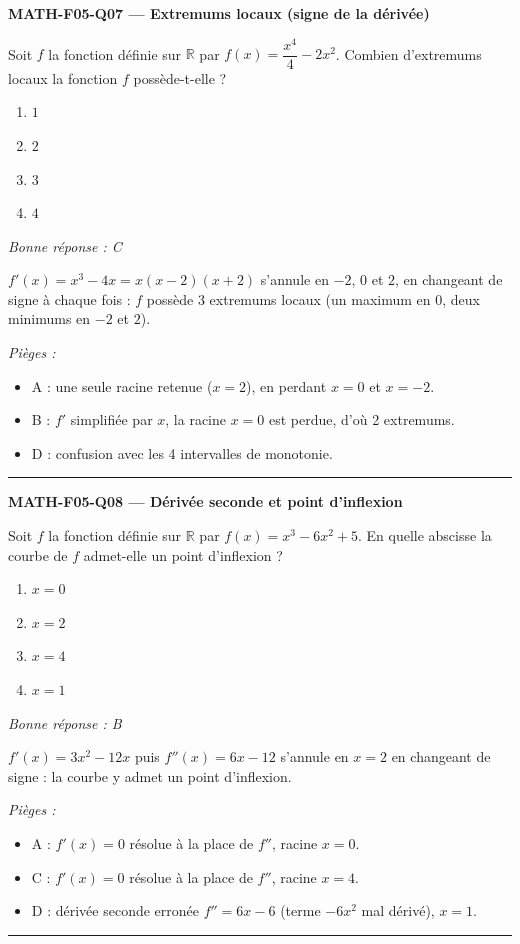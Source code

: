 \documentclass[11pt,a4paper]{article}
\newcommand{\R}{\mathbb{R}}\newcommand{\N}{\mathbb{N}}\newcommand{\Z}{\mathbb{Z}}
\begin{document}
\noindent\textbf{MATH-F05-Q07 --- Extremums locaux (signe de la dérivée)}\par
Soit $f$ la fonction définie sur $\R$ par $f(x)=\dfrac{x^4}{4}-2x^2$. Combien d'extremums locaux la fonction $f$ possède-t-elle ?
\begin{enumerate}[label=\Alph*)]
\item $1$
\item $2$
\item $3$
\item $4$
\end{enumerate}
\textit{Bonne réponse : C}\par
$f'(x)=x^3-4x=x(x-2)(x+2)$ s'annule en $-2$, $0$ et $2$, en changeant de signe à chaque fois : $f$ possède 3 extremums locaux (un maximum en $0$, deux minimums en $-2$ et $2$).\par
\textit{Pièges :}
\begin{itemize}
\item A : une seule racine retenue ($x=2$), en perdant $x=0$ et $x=-2$.
\item B : $f'$ simplifiée par $x$, la racine $x=0$ est perdue, d'où 2 extremums.
\item D : confusion avec les 4 intervalles de monotonie.
\end{itemize}
\vspace{8pt}\hrule\vspace{8pt}

\noindent\textbf{MATH-F05-Q08 --- Dérivée seconde et point d'inflexion}\par
Soit $f$ la fonction définie sur $\R$ par $f(x)=x^3-6x^2+5$. En quelle abscisse la courbe de $f$ admet-elle un point d'inflexion ?
\begin{enumerate}[label=\Alph*)]
\item $x=0$
\item $x=2$
\item $x=4$
\item $x=1$
\end{enumerate}
\textit{Bonne réponse : B}\par
$f'(x)=3x^2-12x$ puis $f''(x)=6x-12$ s'annule en $x=2$ en changeant de signe : la courbe y admet un point d'inflexion.\par
\textit{Pièges :}
\begin{itemize}
\item A : $f'(x)=0$ résolue à la place de $f''$, racine $x=0$.
\item C : $f'(x)=0$ résolue à la place de $f''$, racine $x=4$.
\item D : dérivée seconde erronée $f''=6x-6$ (terme $-6x^2$ mal dérivé), $x=1$.
\end{itemize}
\vspace{8pt}\hrule\vspace{8pt}
\end{document}
